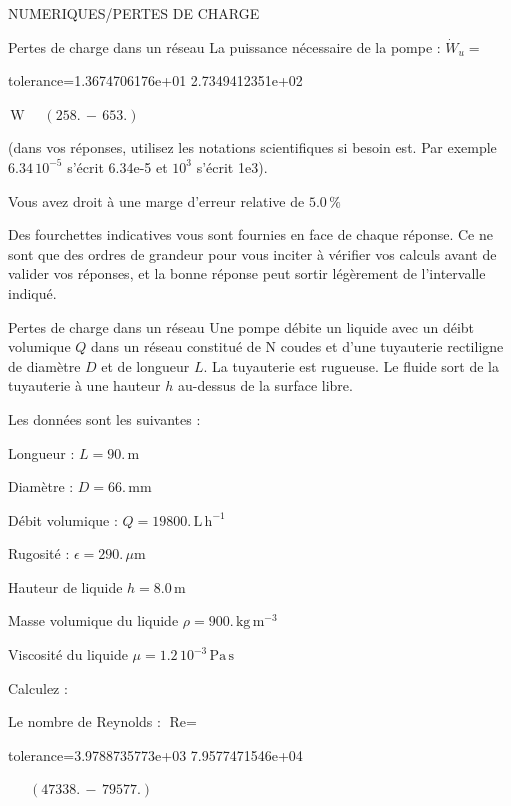 \documentclass[12pt]{article}
\begin{document}
\begin{quiz}{NUMERIQUES/PERTES DE CHARGE}
\begin{cloze}{Pertes de charge dans un réseau}
La puissance nécessaire de la pompe : $\dot{W}_u =  $
\begin{numerical}[points=1] 
\item[tolerance={1.3674706176e+01}] 2.7349412351e+02 
\end{numerical} 
 $\,  \mathrm{W}$ 
 $ \quad (258. \, - \, 653.) $ 

(dans vos réponses, utilisez les notations scientifiques si besoin est. Par exemple $6.34\, 10^{-5}$ s'écrit 6.34e-5 et $10^{3}$ s'écrit 1e3).

Vous avez droit à une marge d'erreur relative de $5.0\, \% $

Des fourchettes indicatives vous sont fournies en face de chaque réponse. Ce ne sont que des ordres de grandeur pour vous inciter à vérifier vos calculs avant de valider vos réponses, et la bonne réponse peut sortir légèrement de l'intervalle indiqué.

\end{cloze} 


 \begin{cloze}{Pertes de charge dans un réseau} 
Une pompe débite un liquide avec un déibt volumique $Q$ dans un réseau constitué de N coudes et d'une tuyauterie rectiligne de diamètre $D$ et de longueur $L$. La tuyauterie est rugueuse. Le fluide sort de la tuyauterie à une hauteur $h$ au-dessus de la surface libre.

Les données sont les suivantes :

Longueur : $L = 90.\,  \mathrm{m} $

Diamètre : $D = 66.\,  \mathrm{mm} $

Débit volumique : $Q = 19800.\,  \mathrm{L}\,  \mathrm{h}^{-1} $

Rugosité : $\epsilon = 290.\, \mu \mathrm{m} $

Hauteur de liquide $h = 8.0\,  \mathrm{m} $

Masse volumique du liquide $\rho = 900.\,  \mathrm{kg}\,  \mathrm{m}^{-3} $

Viscosité du liquide $\mu =  1.2 \, 10^{-3} \,  \mathrm{Pa}\,  \mathrm{s} $

 

Calculez :

 

Le nombre de Reynolds : $\text{Re} =  $
\begin{numerical}[points=1] 
\item[tolerance={3.9788735773e+03}] 7.9577471546e+04 
\end{numerical} 
 $\,$ 
 $ \quad (47338. \, - \, 79577.) $ 


\end{cloze}
\end{quiz}
\end{document}
